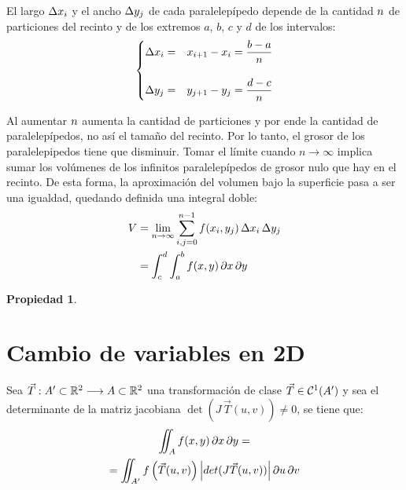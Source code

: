 \documentclass[a5paper,12pt,twoside]{book}
\newtheorem{prop}{{Propiedad}}[chapter]
\begin{document}
El largo $\Delta x_i$ y el ancho $\Delta y_j$ de cada paralelepípedo depende de la cantidad $n$ de particiones del recinto y de los extremos $a$, $b$, $c$ y $d$ de los intervalos:
\begin{equation*}
    \left\{
    \begin{aligned}
        \Delta x_i &=& x_{i+1} - x_i = \dfrac{b-a}{n}
        \\[1em]
        \Delta y_j &=& y_{j+1} - y_j = \dfrac{d-c}{n}
    \end{aligned}
    \right.
\end{equation*}

Al aumentar $n$ aumenta la cantidad de particiones y por ende la cantidad de paralelepípedos, no así el tamaño del recinto.
Por lo tanto, el grosor de los paralelepipedos tiene que disminuir.
Tomar el límite cuando $n\to\infty$ implica sumar los volúmenes de los infinitos paralelepípedos de grosor nulo que hay en el recinto.
De esta forma, la aproximación del volumen bajo la superficie pasa a ser una igualdad, quedando definida una integral doble:
\begin{align*}
    V &= \lim_{n\to\infty} \sum_{i,j=0}^{n-1} f(x_i,y_j) \, \Delta x_i \, \Delta y_j
    \\
    &= \int_c^d \int_a^b f(x,y) \, \partial x \, \partial y
\end{align*}

\begin{mdframed}[style=PropertyFrame]
    \begin{prop}
    \end{prop}
\end{mdframed}


\section*{Cambio de variables en 2D}

Sea $\Vec{T}:A' \subset \mathbb{R}^2 \longrightarrow A \subset \mathbb{R}^2$ una transformación de clase $\Vec{T} \in \mathcal{C}^{1} (A')$ y sea el determinante de la matriz jacobiana $\operatorname{det}(J \, \Vec{T}(u,v)) \neq 0$, se tiene que:
\begin{multline*}
    \iint_A f(x,y) \, \partial x \, \partial y =
    \\
    = \iint_{A'} f \left( \Vec{T}(u,v) \right) {\left| { det(J \Vec{T}(u,v)) } \right|} \, \partial u \, \partial v
\end{multline*}
\end{document}
